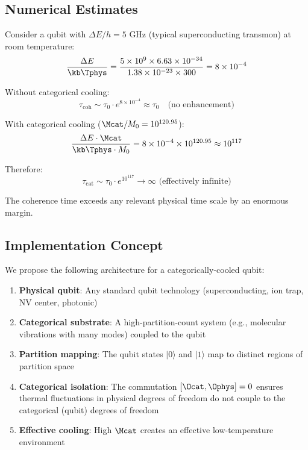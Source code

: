 \subsection{Numerical Estimates}

Consider a qubit with $\Delta E / h = 5$ GHz (typical superconducting transmon) at room temperature:
\begin{equation}
\frac{\Delta E}{\kb \Tphys} = \frac{5 \times 10^9 \times 6.63 \times 10^{-34}}{1.38 \times 10^{-23} \times 300} = 8 \times 10^{-4}
\end{equation}

Without categorical cooling:
\begin{equation}
\tau_{\text{coh}} \sim \tau_0 \cdot e^{8 \times 10^{-4}} \approx \tau_0 \quad \text{(no enhancement)}
\end{equation}

With categorical cooling ($\Mcat/M_0 = 10^{120.95}$):
\begin{equation}
\frac{\Delta E \cdot \Mcat}{\kb \Tphys \cdot M_0} = 8 \times 10^{-4} \times 10^{120.95} \approx 10^{117}
\end{equation}

Therefore:
\begin{equation}
\tau_{\text{cat}} \sim \tau_0 \cdot e^{10^{117}} \to \infty \text{ (effectively infinite)}
\end{equation}

The coherence time exceeds any relevant physical time scale by an enormous margin.

\subsection{Implementation Concept}

We propose the following architecture for a categorically-cooled qubit:

\begin{enumerate}
    \item \textbf{Physical qubit}: Any standard qubit technology (superconducting, ion trap, NV center, photonic)

    \item \textbf{Categorical substrate}: A high-partition-count system (e.g., molecular vibrations with many modes) coupled to the qubit

    \item \textbf{Partition mapping}: The qubit states $|0\rangle$ and $|1\rangle$ map to distinct regions of partition space

    \item \textbf{Categorical isolation}: The commutation $[\Ocat, \Ophys] = 0$ ensures thermal fluctuations in physical degrees of freedom do not couple to the categorical (qubit) degrees of freedom

    \item \textbf{Effective cooling}: High $\Mcat$ creates an effective low-temperature environment
\end{enumerate}

